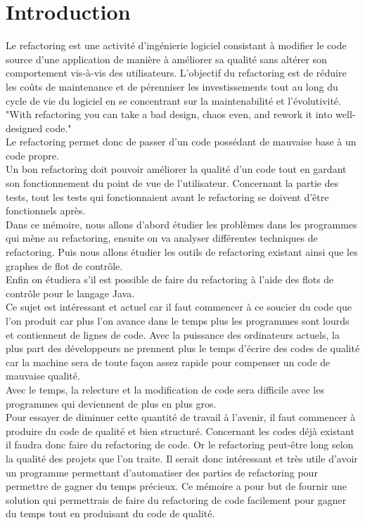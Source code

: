 \documentclass[a4paper,twoside,12pt,openright]{report}
\begin{document}
\section{Introduction}
Le refactoring est une activité d'ingénierie logiciel consistant à modifier le code source d'une application de manière à améliorer sa qualité sans altérer son comportement vis-à-vis des utilisateurs.
L'objectif du refactoring est de réduire les coûts de maintenance et de pérenniser les investissements tout au long du cycle de vie du logiciel en se concentrant sur la maintenabilité et l'évolutivité.\cite{ref1}\\
"With refactoring you can take a bad design, chaos even, and rework it into well-designed code."\cite{ref2}\\
Le refactoring permet donc de passer d'un code possédant de mauvaise base à un code propre.\\
Un bon refactoring doit pouvoir améliorer la qualité d'un code tout en gardant son fonctionnement du point de vue de l'utilisateur. Concernant la partie des tests, tout les tests qui fonctionnaient avant le refactoring se doivent d'être fonctionnels après.\\
Dans ce mémoire, nous allons d'abord étudier les problèmes dans les programmes qui mène au refactoring, ensuite on va analyser différentes techniques de refactoring. Puis nous allons étudier les outils de refactoring existant ainsi que les graphes de flot de contrôle.\\ Enfin on étudiera s'il est possible de faire du refactoring à l'aide des flots de contrôle pour le langage Java.\\
Ce sujet est intéressant et actuel car il faut commencer à ce soucier du code que l'on produit car plus l'on avance dans le temps plus les programmes sont lourds et contiennent de lignes de code. Avec la puissance des ordinateurs actuels, la plus part des développeurs ne prennent plus le temps d'écrire des codes de qualité car la machine sera de toute façon assez rapide pour compenser un code de mauvaise qualité.\cite{ref4}\\
Avec le temps, la relecture et la modification de code sera difficile avec les programmes qui deviennent de plus en plus gros.\cite{ref4}\\
Pour essayer de diminuer cette quantité de travail à l'avenir, il faut commencer à produire du code de qualité et bien structuré. Concernant les codes déjà existant il faudra donc faire du refactoring de code. Or le refactoring peut-être long selon la qualité des projets que l'on traite. Il serait donc intéressant et très utile d'avoir un programme permettant d'automatiser des parties de refactoring pour permettre de gagner du temps précieux. 
Ce mémoire a pour but de fournir une solution qui permettrais de faire du refactoring de code facilement pour gagner du temps tout en produisant du code de qualité.\cite{ref3}
\end{document}
